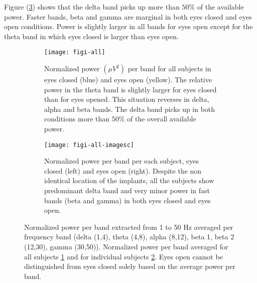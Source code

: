 \documentclass[11pt, onecolumn]{article}
\begin{document}
Figure (\ref{fig:powersp-1}) shows that the delta band picks up more than $50\%$ of the available power. Faster bands, beta and gamma are marginal in both eyes closed and eyes open conditions. Power is slightly larger in all bands for eyes open except for the theta band in which eyes closed is larger than eyes open.

\begin{figure}[ht] 
  \begin{subfigure}[t]{0.5\linewidth}
    \centering
    \texttt{[image: figi-all]} 
    \caption{Normalized power $(\mu V^2)$ per band for all subjects in eyes closed (blue) and eyes open (yellow). The relative power in the theta band is slightly larger for eyes closed than for eyes opened. This situation reverses in delta, alpha and beta bands. The delta band picks up in both conditions more than $50\%$ of the overall available power.} 
    \label{fig:powersp-1:a} 
  \end{subfigure}%
  \hspace{1ex}
  \begin{subfigure}[t]{0.5\linewidth}
    \centering
    \texttt{[image: figi-all-imagesc]} 
    \caption{Normalized power per band per each subject, eyes closed (left) and eyes open (right). Despite the non identical location of the implants, all the subjects show predominant delta band and very minor power in fast bands (beta and gamma) in both eyes closed and eyes open.} 
    \label{fig:powersp-1:b} 
  \end{subfigure} 
  \caption{Normalized power per band extracted from 1 to 50 Hz averaged per frequency band (delta (1,4), theta (4,8), alpha (8,12), beta 1, beta 2 (12,30), gamma (30,50)). 
Normalized power per band averaged for all subjects \ref{fig:powersp-1:a} and for individual subjects \ref{fig:powersp-1:b}. Eyes open cannot be distinguished from eyes closed solely based on the average power per band.}
  \label{fig:powersp-1} 
\end{figure}
\end{document}
